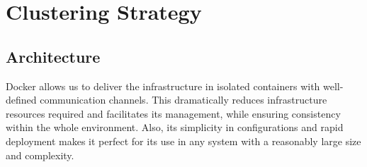 \documentclass[12pt]{article}
\begin{document}




\newpage
\section{Clustering Strategy} \label{strategy} %

\subsection{Architecture} \label{strategy.architecture} %


Docker \cite{docker} allows us to deliver the infrastructure in isolated containers with well-defined communication channels.
This dramatically reduces infrastructure resources required and facilitates its management, while ensuring consistency within the whole environment.
Also, its simplicity in configurations and rapid deployment makes it perfect for its use in any system with a reasonably large size and complexity.
\end{document}
